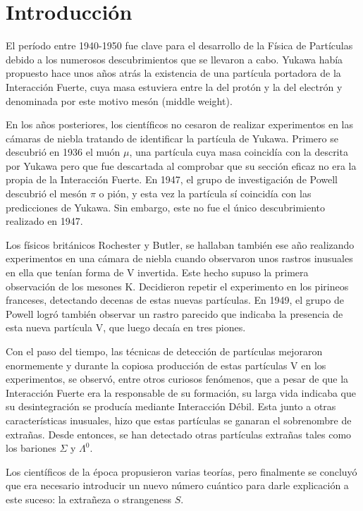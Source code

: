 \renewcommand{\listtablename}{Índice de tablas}
\renewcommand{\tablename}{Tabla}

\chapter{Introducción}\label{cap:intro}
El período entre 1940-1950 fue clave para el desarrollo de la Física de Partículas debido a los numerosos descubrimientos que se llevaron a cabo. Yukawa había propuesto hace unos años atrás la existencia de una partícula portadora de la Interacción Fuerte, cuya masa estuviera entre la del protón y la del electrón y denominada por este motivo mesón (middle weight).
 
En los años posteriores, los científicos no cesaron de realizar experimentos en las cámaras de niebla tratando de identificar la partícula de Yukawa. Primero se descubrió en 1936 el muón $\mu$, una partícula cuya masa coincidía con la descrita por Yukawa pero que fue descartada al comprobar que su sección eficaz no era la propia de la Interacción Fuerte. En 1947, el grupo de investigación de Powell descubrió el mesón $\pi$ o pión, y esta vez la partícula sí coincidía con las predicciones de Yukawa. Sin embargo, este no fue el único descubrimiento realizado en 1947.

Los físicos británicos Rochester y Butler, se hallaban también ese año realizando experimentos en una cámara de niebla cuando observaron unos rastros inusuales en ella que tenían forma de V invertida. Este hecho supuso la primera observación de los mesones K. Decidieron repetir el experimento en los pirineos franceses, detectando decenas de estas nuevas partículas. En 1949, el grupo de Powell logró también observar un rastro parecido que indicaba la presencia de esta nueva partícula V, que luego decaía en tres piones. 

Con el paso del tiempo, las técnicas de detección de partículas mejoraron enormemente y durante la copiosa producción de estas partículas V en los experimentos, se observó, entre otros curiosos fenómenos, que a pesar de que la Interacción Fuerte era la responsable de su formación, su larga vida indicaba que su desintegración se producía mediante Interacción Débil. Esta junto a otras características inusuales, hizo que estas partículas se ganaran el sobrenombre de extrañas. Desde entonces, se han detectado otras partículas extrañas tales como los bariones $\Sigma$ y $\Lambda^0$.

Los científicos de la época propusieron varias teorías, pero finalmente se concluyó que era necesario introducir un nuevo número cuántico para darle explicación a este suceso: la extrañeza o strangeness $S$. \cite{Bardeen2012}\cite{Griffiths2008} \\

